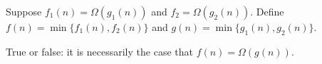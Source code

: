 \begin{prob}
    Suppose $f_1(n) = \Omega(g_1(n))$ and $f_2 = \Omega(g_2(n))$.
    Define $f(n) = \min \{ f_1(n), f_2(n) \}$ and $g(n) = \min \{ g_1(n), g_2(n)\}$.

    True or false: it is necessarily the case that $f(n) = \Omega(g(n))$.

     \Tf{}
\end{prob}
